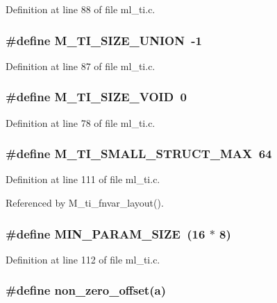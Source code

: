 Definition at line 88 of file ml\_\-ti.c.
\subsubsection{\setlength{\rightskip}{0pt plus 5cm}\#define M\_\-TI\_\-SIZE\_\-UNION~-1}\label{ml__ti_8c_77e87b41964312f9c9aa20edb458bdc0}




Definition at line 87 of file ml\_\-ti.c.
\subsubsection{\setlength{\rightskip}{0pt plus 5cm}\#define M\_\-TI\_\-SIZE\_\-VOID~0}\label{ml__ti_8c_549aa4cf03954346b365fdcedd42bb2c}




Definition at line 78 of file ml\_\-ti.c.
\subsubsection{\setlength{\rightskip}{0pt plus 5cm}\#define M\_\-TI\_\-SMALL\_\-STRUCT\_\-MAX~64}\label{ml__ti_8c_25c2728e88926de1d6b2fe77108c2fdc}




Definition at line 111 of file ml\_\-ti.c.

Referenced by M\_\-ti\_\-fnvar\_\-layout().
\subsubsection{\setlength{\rightskip}{0pt plus 5cm}\#define MIN\_\-PARAM\_\-SIZE~(16 $\ast$ 8)}\label{ml__ti_8c_48f1f5d33d6770a468f7767465e07abb}




Definition at line 112 of file ml\_\-ti.c.
\subsubsection{\setlength{\rightskip}{0pt plus 5cm}\#define non\_\-zero\_\-offset(a)}\label{ml__ti_8c_1a7d03fa0a676d3b09e555d8c8176f1b}


